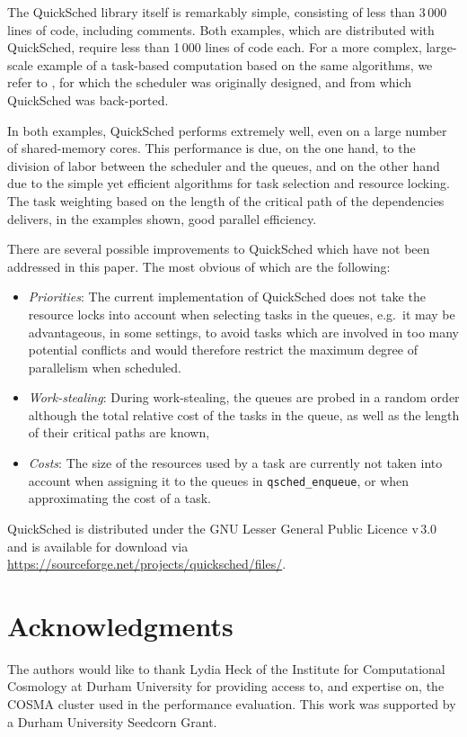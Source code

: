 \documentclass[fleqn,10pt]{wlpeerj}
\begin{document}
The QuickSched library itself is remarkably simple, consisting of
less than 3\,000 lines of code, including comments.
Both examples, which are distributed with QuickSched,
require less than 1\,000 lines of code each.
For a more complex, large-scale example of a task-based computation
based on the same algorithms, we refer to \cite{ref:Gonnet2014},
for which the scheduler was originally designed, and from
which QuickSched was back-ported.

In both examples, QuickSched performs extremely well, even
on a large number of shared-memory cores.
This performance is due, on the one hand, to the
division of labor between the scheduler and the queues,
and on the other hand due to the simple yet efficient
algorithms for task selection and resource locking.
The task weighting based on the length of the critical
path of the dependencies delivers, in the examples shown,
good parallel efficiency.

There are several possible improvements to QuickSched which
have not been addressed in this paper.
The most obvious of which are the following:
\begin{itemize}
    \item {\em Priorities}: The current implementation of
        QuickSched does not take the resource locks into
        account when selecting tasks in the queues, e.g.~it
        may be advantageous, in some settings, to avoid tasks
        which are involved in too many potential conflicts
        and would therefore restrict the maximum degree of
        parallelism when scheduled.
    \item {\em Work-stealing}: During work-stealing, the
        queues are probed in a random order although
        the total relative cost of the tasks in the queue,
        as well as the length of their critical paths are
        known,
    \item {\em Costs}: The size of the resources used by
        a task are currently not taken into account when
        assigning it to the queues in {\tt qsched\_enqueue},
        or when approximating the cost of a task.
\end{itemize}

QuickSched is distributed under the GNU Lesser General Public Licence
v\,3.0 and is available for download via
\url{https://sourceforge.net/projects/quicksched/files/}.


\section*{Acknowledgments}
The authors would like to thank Lydia Heck of the Institute for
Computational Cosmology at Durham University for providing access
to, and expertise on, the COSMA cluster used in the performance
evaluation.
This work was supported by a Durham University Seedcorn Grant.
\end{document}
